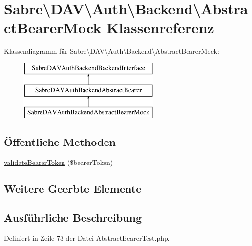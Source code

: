 \hypertarget{class_sabre_1_1_d_a_v_1_1_auth_1_1_backend_1_1_abstract_bearer_mock}{}\section{Sabre\textbackslash{}D\+AV\textbackslash{}Auth\textbackslash{}Backend\textbackslash{}Abstract\+Bearer\+Mock Klassenreferenz}
\label{class_sabre_1_1_d_a_v_1_1_auth_1_1_backend_1_1_abstract_bearer_mock}
Klassendiagramm für Sabre\textbackslash{}D\+AV\textbackslash{}Auth\textbackslash{}Backend\textbackslash{}Abstract\+Bearer\+Mock\+:\begin{figure}[H]
\begin{center}
\leavevmode
\includegraphics[height=3.000000cm]{class_sabre_1_1_d_a_v_1_1_auth_1_1_backend_1_1_abstract_bearer_mock}
\end{center}
\end{figure}
\subsection*{Öffentliche Methoden}
\begin{DoxyCompactItemize}
\item 
\mbox{\hyperlink{class_sabre_1_1_d_a_v_1_1_auth_1_1_backend_1_1_abstract_bearer_mock_a16162ddd0f80118307a88824d67ce63c}{validate\+Bearer\+Token}} (\$bearer\+Token)
\end{DoxyCompactItemize}
\subsection*{Weitere Geerbte Elemente}


\subsection{Ausführliche Beschreibung}


Definiert in Zeile 73 der Datei Abstract\+Bearer\+Test.\+php.



